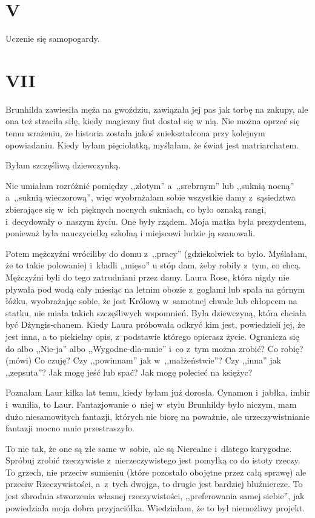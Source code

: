 \documentclass[oneside,polish,12pt,sfheadings]{mwbk}
\begin{document}
\chapter{V}

Uczenie się samopogardy.

\chapter{VII}

Brunhilda zawiesiła męża na gwoździu, zawiązała jej pas jak torbę
na zakupy, ale ona też straciła siłę, kiedy magiczny fiut dostał się
w nią. Nie można oprzeć się temu wrażeniu, że historia została jakoś
zniekształcona przy kolejnym opowiadaniu. Kiedy byłam pięciolatką,
myślałam, że świat jest matriarchatem.

Byłam szczęśliwą dziewczynką.

Nie umiałam rozróżnić pomiędzy ,,złotym'' a~,,srebrnym'' lub ,,suknią
nocną'' a~,,suknią wieczorową'', więc wyobrażałam sobie wszystkie
damy z~sąsiedztwa zbierające się w~ich pięknych nocnych sukniach,
co było oznaką rangi, i~decydowały o~naszym życiu. One były rządem.
Moja matka była prezydentem, ponieważ była nauczycielką szkolną i
miejscowi ludzie ją szanowali.

Potem mężczyźni wróciliby do domu z~,,pracy'' (gdziekolwiek to było.
Myślałam, że to takie polowanie) i~kładli ,,mięso'' u stóp dam, żeby
robiły z~tym, co chcą. Mężczyźni byli do tego zatrudniani przez damy.
Laura Rose, która nigdy nie pływała pod wodą cały miesiąc na letnim
obozie z~goglami lub spała na górnym łóżku, wyobrażając sobie, że
jest Królową w~samotnej chwale lub chłopcem na statku, nie miała takich
szczęśliwych wspomnień. Była dziewczyną, która chciała być Dżyngis-chanem.
Kiedy Laura próbowała odkryć kim jest, powiedzieli jej, że jest inna,
a to piekielny opis, z~podstawie którego opierasz życie. Ogranicza
się do albo ,,Nie-ja'' albo ,,Wygodne-dla-mnie'' i~co z~tym można
zrobić? Co robię? (mówi) Co czuję? Czy ,,powinnam'' jak w~,,małżeństwie''?
Czy ,,inna'' jak ,,zepsuta''? Jak mogę jeść lub spać? Jak mogę polecieć
na księżyc?

Poznałam Laur kilka lat temu, kiedy byłam już dorosła. Cynamon i~jabłka,
imbir i~wanilia, to Laur. Fantazjowanie o~niej w~stylu Brunhildy było
niczym, mam dużo niesamowitych fantazji, których nie biorę na poważnie,
ale urzeczywistnianie fantazji mocno mnie przestraszyło.

To nie tak, że one są złe same w~sobie, ale są Nierealne i~dlatego
karygodne. Spróbuj zrobić rzeczywiste z~nierzeczywistego jest pomyłką
co do istoty rzeczy. To grzech, nie przeciw sumieniu (które pozostało
obojętne przez całą sprawę) ale przeciw Rzeczywistości, a~z~tych dwojga,
to drugie jest bardziej bluźniercze. To jest zbrodnia stworzenia własnej
rzeczywistości, ,,preferowania samej siebie'', jak powiedziała moja
dobra przyjaciółka. Wiedziałam, że to był niemożliwy projekt.
\end{document}
